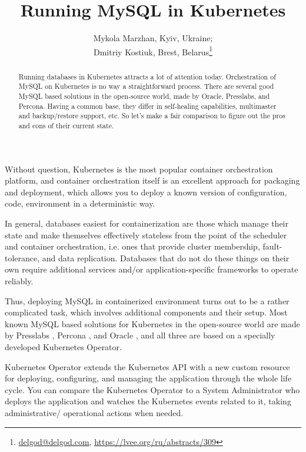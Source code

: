 \documentclass[10pt, a5paper]{article}
\begin{document}
\title{Running MySQL in Kubernetes}
\author{Mykola Marzhan, Kyiv, Ukraine; \\ Dmitriy Kostiuk, Brest, Belarus\footnote{\url{delgod@delgod.com}, \url {https://lvee.org/ru/abstracts/309}} }
\maketitle
\begin{abstract}
Running databases in Kubernetes attracts a lot of attention today. Orсhestration of MySQL on Kubernetes is no way a \linebreak straightforward process. There are several good MySQL based solutions in the open-source world, made by Oracle, Presslabs, and Percona. Having a common base, they differ in self-healing capabilities, multimaster and backup/restore support, etc. So let’s make a fair comparison to figure out the pros and cons of their current state.
\end{abstract}
Without question, Kubernetes is the most popular container \linebreak orchestration platform, and container orchestration itself is an excellent approach for packaging and deployment, which allows you to deploy a known version of configuration, code, environment in a deterministic way.

In general, databases easiest for containerization are those which manage their state and make themselves effectively stateless from the point of the scheduler and container orchestration, i.e. ones that provide cluster membership, fault-tolerance, and data replication. Databases that do not do these things on their own require additional services and/or application-specific frameworks to operate reliably.

Thus, deploying MySQL in containerized environment turns out to be a rather complicated task, which involves additional components and their setup. Most known MySQL based solutions for Kubernetes in the open-source world are made by Presslabs \cite{bib1}, Percona \cite{bib2}, and Oracle \cite{bib3}, and all three are based on a specially developed Kubernetes Operator.

Kubernetes Operator extends the Kubernetes API with a new \linebreak custom resource for deploying, configuring, and managing the application through the whole life cycle. You can compare the Kubernetes Operator to a System Administrator who deploys the application and watches the Kubernetes events related to it, taking administrative/ operational actions when needed.
\end{document}
